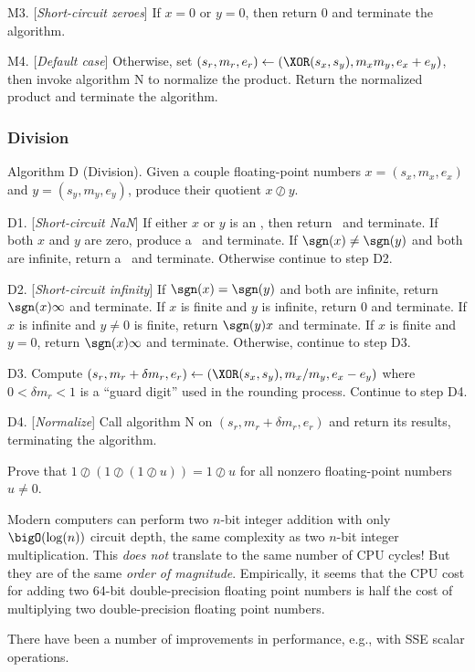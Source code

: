 \algstep M3. [{\it Short-circuit zeroes\/}] If $x=0$ or $y=0$, then
return 0 and terminate the algorithm.

\algstep M4. [{\it Default case\/}] Otherwise, set
$(s_{r}, m_{r},e_{r})\gets (\XOR(s_{x},s_{y}), m_{x}m_{y}, e_{x}+e_{y})$,
then invoke algorithm N to normalize the product. Return the normalized
product and terminate the algorithm.\quad\slug

\subsubsection{Division}

\algbegin Algorithm D (Division). \label{alg:float-division}Given a couple floating-point
numbers $x=(s_{x},m_{x},e_{x})$ and $y=(s_{y}, m_{y}, e_{y})$, produce
their quotient $x\oslash y$.

\algstep D1. [{\it Short-circuit NaN\/}] If either $x$ or $y$ is an
\NaN, then return \qNaN\ and terminate. If both $x$ and $y$ are zero,
produce a \qNaN\ and terminate. If $\sgn(x)\neq\sgn(y)$ and both are
infinite, return a \qNaN\ and terminate. Otherwise continue to step D2.

\algstep D2. [{\it Short-circuit infinity\/}]
If $\sgn(x)=\sgn(y)$ and both are infinite, return $\sgn(x)\infty$ and terminate.
If $x$ is finite and $y$ is infinite, return 0 and terminate.
If $x$ is infinite and $y\neq0$ is finite, return $\sgn(y)x$ and terminate.
If $x$ is finite and $y=0$, return $\sgn(x)\infty$ and terminate.
Otherwise, continue to step D3.

\algstep D3. Compute $(s_{r},m_{r} + \delta m_{r},e_{r})\gets (\XOR(s_{x},s_{y}),m_{x}/m_{y},e_{x}-e_{y})$
where $0<\delta m_{r}<1$ is a ``guard digit'' used in the rounding
process. Continue to step D4.

\algstep D4. [{\it Normalize\/}] Call algorithm N on
$(s_{r}, m_{r}+\delta m_{r}, e_{r})$ and return its results, terminating
the algorithm.\quad\slug

\begin{xca}
  Prove that $1\oslash(1\oslash (1\oslash u))=1\oslash u$ for all
  nonzero floating-point numbers $u\neq 0$.
\end{xca}

\begin{rmk}
  Modern computers can perform two $n$-bit integer addition with only
  $\bigO(\log(n))$ circuit depth, the same complexity as two $n$-bit
  integer multiplication. This \emph{does not} translate to the same
  number of CPU cycles! But they are of the same \emph{order of magnitude}.
  Empirically, it seems that the CPU cost for adding two 64-bit
  double-precision floating point numbers is half the cost of multiplying two
  double-precision floating point numbers.

  There have been a number of improvements in performance, e.g., with
  SSE scalar operations.
\end{rmk}


